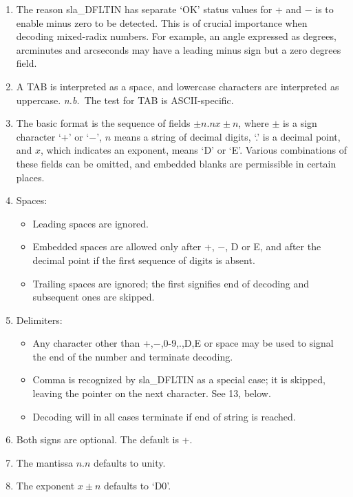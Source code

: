 \documentclass[11pt,twoside]{article}
\begin{document}
{
 \begin{enumerate}
 \item The reason sla\_DFLTIN has separate `OK' status values
       for + and $-$ is to enable minus zero to be detected.
       This is of crucial importance
       when decoding mixed-radix numbers.  For example, an angle
       expressed as degrees, arcminutes and arcseconds may have a
       leading minus sign but a zero degrees field.
 \item A TAB is interpreted as a space, and lowercase characters are
       interpreted as uppercase.  {\it n.b.}\ The test for TAB is
       ASCII-specific.
 \item The basic format is the sequence of fields $\pm n.n x \pm n$,
       where $\pm$ is a sign
       character `+' or `$-$', $n$ means a string of decimal digits,
       `.' is a decimal point, and $x$, which indicates an exponent,
       means `D' or `E'.  Various combinations of these fields can be
       omitted, and embedded blanks are permissible in certain places.
 \item Spaces:
       \begin{itemize}
       \item Leading spaces are ignored.
       \item Embedded spaces are allowed only after +, $-$, D or E,
             and after the decimal point if the first sequence of
             digits is absent.
       \item Trailing spaces are ignored;  the first signifies
             end of decoding and subsequent ones are skipped.
       \end{itemize}
 \item Delimiters:
       \begin{itemize}
       \item Any character other than +,$-$,0-9,.,D,E or space may be
             used to signal the end of the number and terminate decoding.
       \item Comma is recognized by sla\_DFLTIN as a special case; it
             is skipped, leaving the pointer on the next character.  See
             13, below.
       \item Decoding will in all cases terminate if end of string
             is reached.
       \end{itemize}
 \item Both signs are optional.  The default is +.
 \item The mantissa $n.n$ defaults to unity.
 \item The exponent $x\!\pm\!n$ defaults to `D0'.

\end{enumerate}}
\end{document}
